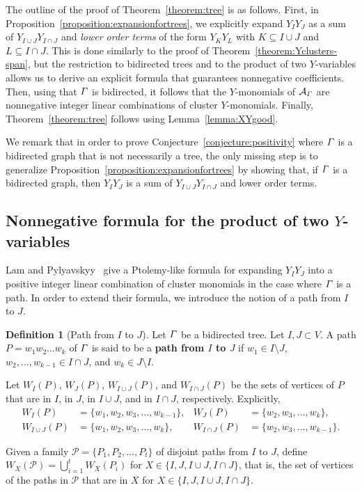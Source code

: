 \documentclass[11pt]{article}
\theoremstyle{definition}
\newtheorem{defi}[theo]{Definition}
\numberwithin{equation}{section}
\newcommand{\vocab}[1]{\textbf{#1}}
\newcommand{\vertices}{V}
\newcommand{\graphLPalgebra}[1]{\mathcal{A}_{#1}}
\begin{document}
The outline of the proof of Theorem~\ref{theorem:tree} is as follows.
First, in Proposition~\ref{proposition:expansionfortrees},
we explicitly expand \(Y_IY_J\) as a sum of \(Y_{I \cup J}Y_{I \cap J}\) and \emph{lower order terms} of the form \(Y_{K}Y_{L}\) with \(K \subseteq I \cup J\) and \(L \subseteq I \cap J\).
This is done similarly to the proof of Theorem~\ref{theorem:Yclusters-span},
but the restriction to bidirected trees and to the product of two \(Y\)-variables allows us to derive an explicit formula that guarantees nonnegative coefficients.
Then, using that \(\varGamma\) is bidirected, it follows that the \(Y\)-monomials of \(\graphLPalgebra{\graph}\) are nonnegative integer linear combinations of cluster \(Y\)-monomials.
Finally, Theorem~\ref{theorem:tree} follows using Lemma~\ref{lemma:XYgood}.

We remark that in order to prove Conjecture~\ref{conjecture:positivity} where \(\varGamma\) is a bidirected graph that is not necessarily a tree, the only missing step is to generalize Proposition~\ref{proposition:expansionfortrees} by showing that, if \(\varGamma\) is a bidirected graph, then \(Y_IY_J\) is a sum of \(Y_{I \cup J}Y_{I \cap J}\) and lower order terms.

\subsection{Nonnegative formula for the product of two \texorpdfstring{\(Y\)}{Y}-variables}

Lam and Pylyavskyy~\cite[Theorem 6.1]{linearLP} give a Ptolemy-like formula for expanding \(Y_IY_J\) into a positive integer linear combination of cluster monomials in the case where \(\varGamma\) is a path.
In order to extend their formula, we introduce the notion of a path from \(I\) to \(J\).

\begin{defi}[Path from \(I\) to \(J\)]
    Let \(\varGamma\) be a bidirected tree.
    Let \(I, J \subset \vertices\).
    A path \(P = w_1w_2\dots w_k\) of \(\varGamma\) is said to be a \vocab{path from \(I\) to \(J\)}
    if \(w_1 \in I \setminus J\), \(w_2, \dots, w_{k-1} \in I \cap J\), and \(w_k \in J \setminus I\).

    Let \(W_I(P)\), \(W_J(P)\), \(W_{I \cup J}(P)\), and \(W_{I \cap J}(P)\)
    be the sets of vertices of \(P\) that are in \(I\), in \(J\), in \(I \cup J\), and in \(I \cap J\), respectively.
    Explicitly,
    \begin{align*}
        W_I(P) & = \{w_1, w_2, w_3, \dots, w_{k-1}\}, &
        W_J(P) & = \{w_2, w_3, \dots, w_k\}, \\
        W_{I \cup J}(P) & = \{w_1, w_2, w_3, \dots, w_k\}, &
        W_{I \cap J}(P) & = \{w_2, w_3, \dots, w_{k-1}\}.
    \end{align*}

    Given a family \(\mathcal{P} = \{P_1, P_2, \dots, P_t\}\) of disjoint paths from \(I\) to \(J\),
    define \(W_X(\mathcal{P}) = \bigcup_{i=1}^t W_X(P_i)\) for \(X \in \{I, J, I \cup J, I \cap J\}\),
    that is, the set of vertices of the paths in \(\mathcal{P}\) that are in \(X\) for \(X \in \{I, J, I \cup J, I \cap J\}\).
\end{defi}
\end{document}
